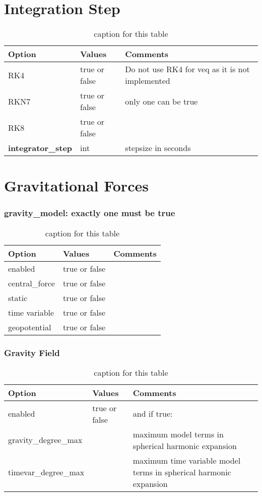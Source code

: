 \section{Integration Step}
\begin{table}[h!]
	\begin{tabular}{|p{2.5cm}|p{2.5cm}|p{5cm}|}
		\hline
		Option & Values & Comments \\
		\hline
		RK4 & true or false &  Do not use RK4 for veq as it is not implemented\\ 
		RKN7 & true or false & only one can be true\\ 
		RK8  & true or false & \\
		\hline
		\textbf{integrator\_step} & int & stepsize in seconds \\
		\hline
	\end{tabular}
	\caption{caption for this table}
	\label{table:label_name}
\end{table}
%
\section{Gravitational Forces}
%
\subsubsection{gravity\_model: exactly one must be true}
\begin{table}[h!]
	\begin{tabular}{|p{2.5cm}|p{2.5cm}|p{5cm}|}
		\hline
		Option & Values & Comments \\
		\hline
		enabled & true or false & \\
		central\_force & true or false &  \\ 
		static & true or false &  \\
		time variable & true or false &  \\
		geopotential & true or false &  \\
		\hline
	\end{tabular}
	\caption{caption for this table}
	\label{table:label_name}
\end{table}
%

\subsubsection{Gravity Field}
\begin{table}[h!]
	\begin{tabular}{|p{2.5cm}|p{2.5cm}|p{5cm}|}
		\hline
		Option & Values & Comments \\
		\hline
        enabled & true or false & and if true:\\
        gravity\_degree\_max &  & maximum model terms in spherical harmonic expansion \\ 
        timevar\_degree\_max &  & maximum time variable model terms in spherical harmonic expansion \\
        \hline
	\end{tabular}
	\caption{caption for this table}
	\label{table:label_name}
\end{table}
%
